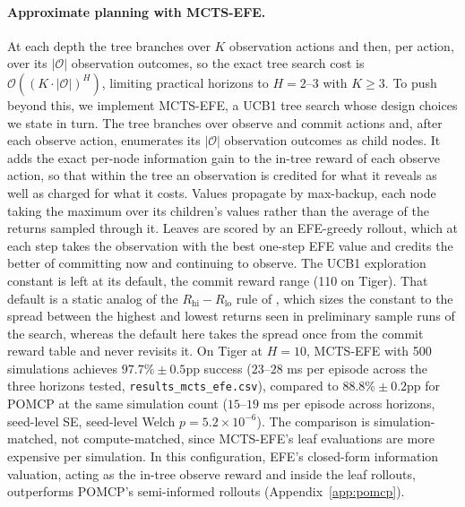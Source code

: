\paragraph{Approximate planning with MCTS-EFE.}
At each depth the tree branches over $K$ observation actions and then, per action, over its $|\mathcal{O}|$ observation outcomes, so the exact tree search cost is $\mathcal{O}((K \cdot |\mathcal{O}|)^H)$, limiting practical horizons to $H{=}2$--$3$ with $K \geq 3$. To push beyond this, we implement MCTS-EFE, a UCB1 tree search whose design choices we state in turn. The tree branches over observe and commit actions and, after each observe action, enumerates its $|\mathcal{O}|$ observation outcomes as child nodes. It adds the exact per-node information gain to the in-tree reward of each observe action, so that within the tree an observation is credited for what it reveals as well as charged for what it costs. Values propagate by max-backup, each node taking the maximum over its children's values rather than the average of the returns sampled through it. Leaves are scored by an EFE-greedy rollout, which at each step takes the observation with the best one-step EFE value and credits the better of committing now and continuing to observe. The UCB1 exploration constant is left at its default, the commit reward range (110 on Tiger). That default is a static analog of the $R_{\mathrm{hi}} - R_{\mathrm{lo}}$ rule of \citet{silver2010}, which sizes the constant to the spread between the highest and lowest returns seen in preliminary sample runs of the search, whereas the default here takes the spread once from the commit reward table and never revisits it. On Tiger at $H{=}10$, MCTS-EFE with 500 simulations achieves $97.7\% \pm 0.5$pp success ($23$--$28$ ms per episode across the three horizons tested, \texttt{results\_\allowbreak mcts\_\allowbreak efe.csv}), compared to $88.8\% \pm 0.2$pp for POMCP at the same simulation count ($15$--$19$ ms per episode across horizons, seed-level SE, seed-level Welch $p{=}5.2{\times}10^{-6}$). The comparison is simulation-matched, not compute-matched, since MCTS-EFE's leaf evaluations are more expensive per simulation. In this configuration, EFE's closed-form information valuation, acting as the in-tree observe reward and inside the leaf rollouts, outperforms POMCP's semi-informed rollouts (Appendix~\ref{app:pomcp}).

